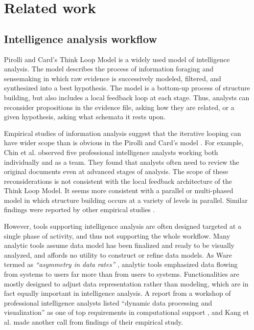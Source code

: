 \section{Related work}\label{related-work}

\subsection{Intelligence analysis workflow}

Pirolli and Card's Think Loop Model \cite{Pirolli2005} is a widely used model of intelligence analysis. The model describes the process of information foraging and sensemaking in which raw evidence is successively modeled, filtered, and synthesized into a best hypothesis. The model is a bottom-up process of structure building, but also includes a local feedback loop at each stage. Thus, analysts can reconsider propositions in the evidence file, asking how they are related, or a given hypothesis, asking what schemata it rests upon.

Empirical studies of information analysis suggest that the iterative looping can have wider scope than is obvious in the Pirolli and Card's model \cite{Pirolli2005}. For example, Chin et al. \cite{Chin2009} observed five professional intelligence analysts working both individually and as a team. They found that analysts often need to review the original documents even at advanced stages of analysis. The scope of these reconsiderations is not consistent with the local feedback architecture of the Think Loop Model. It seems more consistent with a parallel or multi-phased model \cite{Wheaton2011} in which structure building occurs at a variety of levels in parallel. Similar findings were reported by other empirical studies \cite{Isenberg2008b,Kang2011,Herrmann2013a}. 

However, tools supporting intelligence analysis are often designed targeted at a single phase of activity, and thus not supporting the whole workflow. Many analytic tools assume data model has been
finalized and ready to be visually analyzed, and affords no utility
to construct or refine data models. As Ware termed as \emph{``asymmetry in
data rates''} \cite[p.382]{Ware2012}, analytic tools emphasized data
flowing from systems to users far more than from users to systems.
Functionalities are mostly designed to adjust data representation
rather than modeling, which are in fact equally important in intelligence analysis. A report from a workshop of professional intelligence analysts listed ``dynamic data processing and visualization'' as one of top requirements in computational support \cite{Badalamente2005}, and Kang et al. \cite{Kang2011} made another call from findings of their empirical study.

